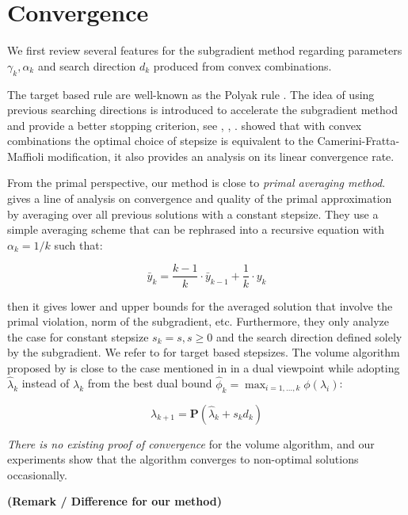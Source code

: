 \hypertarget{convergence}{%
  \section{Convergence}\label{convergence}}


We first review several features for the subgradient method regarding
parameters \(\gamma_k, \alpha_k\) and search direction \(d_k\) produced from convex combinations.

The target based rule are well-known as the Polyak rule \cite{polyak_general_1967}.
The idea of using previous searching directions is introduced to accelerate the subgradient method and provide a better stopping criterion,
see \cite{camerini1975improving}, \cite{brannlund1995generalized}, \cite{barahona_volume_2000}.
\cite{brannlund1995generalized} showed that with convex combinations the optimal choice of stepsize is
equivalent to the Camerini-Fratta-Maffioli modification, it also provides an analysis on its linear convergence rate.

From the primal perspective, our method is close to \emph{primal
  averaging method}. \cite{nedic_approximate_2009}
gives a line of analysis on convergence and quality of the primal
approximation by averaging over all previous solutions with a constant
stepsize. They use a simple averaging scheme that can be rephrased into a
recursive equation with \(\alpha_k = 1/k\) such that:

\[\bar y_k = \frac{k-1}{k}\cdot\bar y_{k-1} + \frac{1}{k} \cdot y_k\]

then it gives lower and upper bounds for the averaged solution
that involve the primal violation, norm of the subgradient, etc. Furthermore, they only analyze the case for constant
stepsize \(s_k = s, s\ge 0\) and the search direction defined solely by
the subgradient. We refer to \cite{kiwiel_lagrangian_2007} for target based
stepsizes. The volume algorithm proposed by \cite{barahona_volume_2000} is close to the
case mentioned in \cite{brannlund1995generalized} in a dual
viewpoint while adopting \(\hat \lambda_{k}\) instead of \(\lambda_k\) from the best dual bound
\(\hat \phi_k = \max_{i=1, ..., k} \phi(\lambda_i)\):

\[\lambda_{k+1} = \mathbf{P}(\hat\lambda_{k} + s_{k}d_{k})\]

\emph{There is no existing proof of convergence} for the volume
algorithm, and our experiments show that the algorithm converges to
non-optimal solutions occasionally.

\textbf{(Remark / Difference for our method)}

